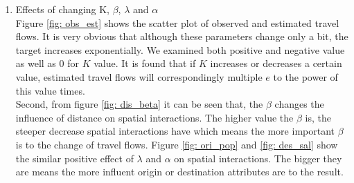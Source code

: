 \documentclass[a4paper,reqno,]{article}
\begin{document}
\begin{enumerate}
\item Effects of changing K, $\beta$, $\lambda$ and $\alpha$
\\Figure \ref{fig: obs_est} shows the scatter plot of observed and estimated travel flows. It is very obvious that although these parameters change only a bit, the target increases exponentially. We examined both positive and negative value as well as 0 for $K$ value. It is found that if $K$ increases or decreases a certain value, estimated travel flows will correspondingly multiple $e$ to the power of this value times. 
\\Second, from figure \ref{fig: dis_beta} it can be seen that, the $\beta$ changes the influence of distance on spatial interactions. The higher value the $\beta$ is, the steeper decrease spatial interactions have which means the more important $\beta$ is to the change of travel flows. Figure \ref{fig: ori_pop} and \ref{fig: des_sal} show the similar positive effect of $\lambda$ and $\alpha$ on spatial interactions. The bigger they are means the more influent origin or destination attributes  are to the result. 


\end{enumerate}
\end{document}
